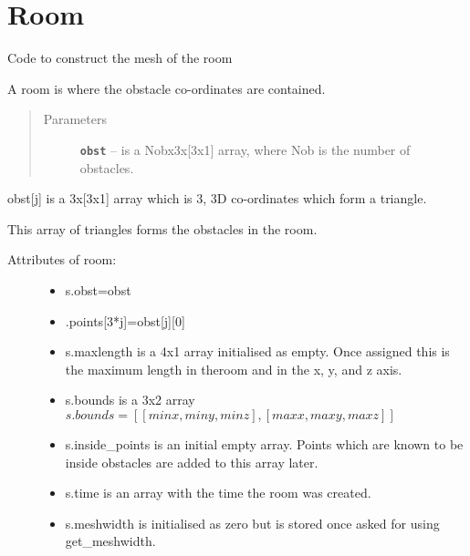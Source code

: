 \documentclass[letterpaper,10pt,english]{sphinxmanual}
\begin{document}
\chapter{Room}
\label{index:room}\label{index:module-Room}
Code to construct the mesh of the room

\begin{fulllineitems}
\label{index:Room.room}
A room is where the obstacle co-ordinates are contained.
\begin{quote}\begin{description}
\item[{Parameters}] \leavevmode
\textbf{\texttt{obst}} -- is a Nobx3x{[}3x1{]} array, where Nob is the number of     obstacles.

\end{description}\end{quote}

obst{[}j{]} is a 3x{[}3x1{]} array which is 3, 3D co-ordinates   which form a triangle.

This array of triangles forms the obstacles in the room.
\begin{description}
\item[{Attributes of room:}] \leavevmode\begin{itemize}
\item {} 
s.obst=obst

\item {} 
.points{[}3*j{]}=obst{[}j{]}{[}0{]}

\item {} 
s.maxlength is a 4x1 array initialised as empty. Once assigned     this is the maximum length in theroom and in the x, y, and z axis.

\item {} 
s.bounds is a 3x2 array     \(s.bounds= [ [minx, miny, minz], [maxx,maxy,maxz]]\)

\item {} 
s.inside\_points is an initial empty array. Points which are known     to be inside obstacles are added to this array later.

\item {} 
s.time is an array with the time the room was created.

\item {} 
s.meshwidth is initialised as zero but is stored once asked for     using get\_meshwidth.


\end{itemize}
\end{description}
\end{fulllineitems}
\end{document}
